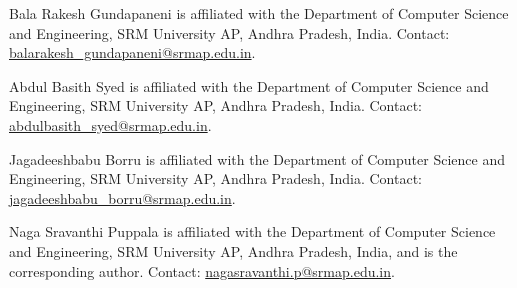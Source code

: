 \begin{IEEEbiographynophoto}{Bala Rakesh Gundapaneni}
is affiliated with the Department of Computer Science and Engineering, SRM University AP, Andhra Pradesh, India. Contact: \url{balarakesh_gundapaneni@srmap.edu.in}.
\end{IEEEbiographynophoto}
\begin{IEEEbiographynophoto}{Abdul Basith Syed}
is affiliated with the Department of Computer Science and Engineering, SRM University AP, Andhra Pradesh, India. Contact: \url{abdulbasith_syed@srmap.edu.in}.
\end{IEEEbiographynophoto}
\begin{IEEEbiographynophoto}{Jagadeeshbabu Borru}
is affiliated with the Department of Computer Science and Engineering, SRM University AP, Andhra Pradesh, India. Contact: \url{jagadeeshbabu_borru@srmap.edu.in}.
\end{IEEEbiographynophoto}
\begin{IEEEbiographynophoto}{Naga Sravanthi Puppala}
is affiliated with the Department of Computer Science and Engineering, SRM University AP, Andhra Pradesh, India, and is the corresponding author. Contact: \url{nagasravanthi.p@srmap.edu.in}.\EOD
\end{IEEEbiographynophoto}
